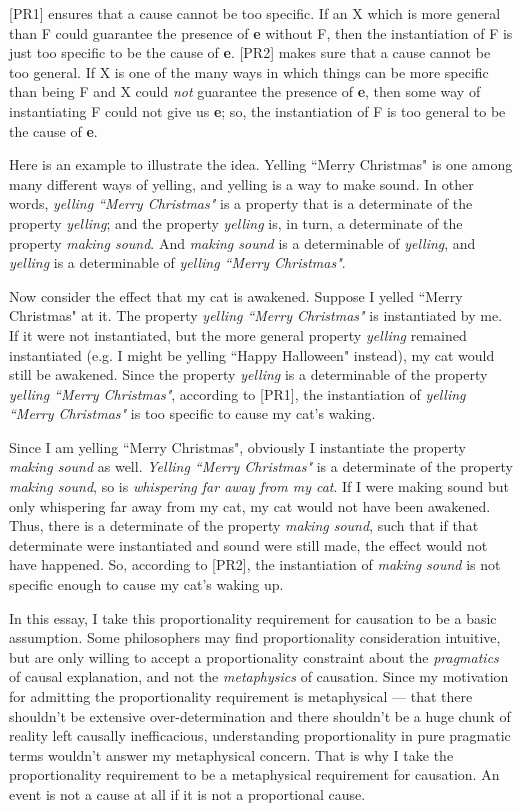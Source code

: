 \documentclass[a4paper,12pt]{article}
\begin{document}
[PR1] ensures that a cause cannot be too specific. If an X which is more general than F could guarantee the presence of \textbf{e} without F, then the instantiation of F is just too specific to be the cause of \textbf{e}. [PR2] makes sure that a cause cannot be too general. If X is one of the many ways in which things can be more specific than being F and X could \emph{not} guarantee the presence of \textbf{e}, then some way of instantiating F could not give us \textbf{e}; so, the instantiation of F is too general to be the cause of \textbf{e}.

Here is an example to illustrate the idea. Yelling ``Merry Christmas" is one among many different ways of yelling, and yelling is a way to make sound. In other words, \emph{yelling ``Merry Christmas"} is a property that is a determinate of the property \emph{yelling}; and the property \emph{yelling} is, in turn, a determinate of the property \emph{making sound}. And \emph{making sound} is a determinable of \emph{yelling}, and \emph{yelling} is a determinable of \emph{yelling ``Merry Christmas"}.

Now consider the effect that my cat is awakened. Suppose I yelled ``Merry Christmas" at it. The property \emph{yelling ``Merry Christmas"} is instantiated by me. If it were not instantiated, but the more general property \emph{yelling} remained instantiated (e.g. I might be yelling ``Happy Halloween" instead), my cat would still be awakened. Since the property \emph{yelling} is a determinable of the property \emph{yelling ``Merry Christmas"}, according to [PR1], the instantiation of \emph{yelling ``Merry Christmas"} is too specific to cause my cat's waking.

Since I am yelling ``Merry Christmas", obviously I instantiate the property \emph{making sound} as well. \emph{Yelling ``Merry Christmas"} is a determinate of the property \emph{making sound}, so is \emph{whispering far away from my cat}. If I were making sound but only whispering far away from my cat, my cat would not have been awakened. Thus, there is a determinate of the property \emph{making sound}, such that if that determinate were instantiated and sound were still made, the effect would not have happened. So, according to [PR2], the instantiation of \emph{making sound} is not specific enough to cause my cat's waking up.

In this essay, I take this proportionality requirement for causation to be a basic assumption. Some philosophers may find proportionality consideration intuitive, but are only willing to accept a proportionality constraint about the \emph{pragmatics} of causal explanation, and not the \emph{metaphysics} of causation. Since my motivation for admitting the proportionality requirement is metaphysical --- that there shouldn't be extensive over-determination and there shouldn't be a huge chunk of reality left causally inefficacious, understanding proportionality in pure pragmatic terms wouldn't answer my metaphysical concern. That is why I take the proportionality requirement to be a metaphysical requirement for causation. An event is not a cause at all if it is not a proportional cause.
\end{document}
